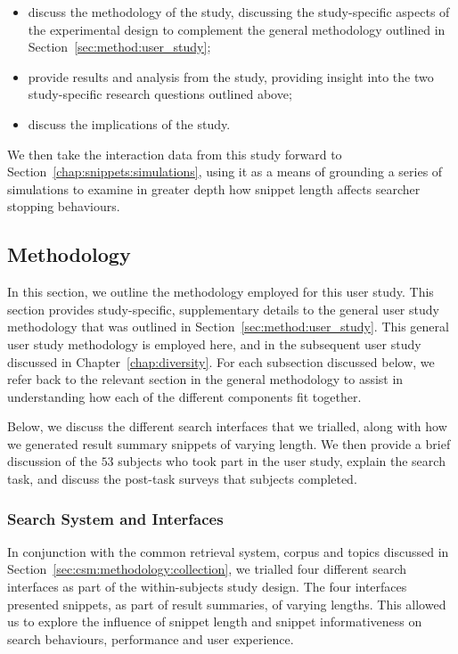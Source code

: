 \begin{itemize}
    \item{discuss the methodology of the study, discussing the study-specific aspects of the experimental design to complement the general methodology outlined in Section~\ref{sec:method:user_study};}
    \item{provide results and analysis from the study, providing insight into the two study-specific research questions outlined above;}
    \item{discuss the implications of the study.}
\end{itemize}

We then take the interaction data from this study forward to Section~\ref{chap:snippets:simulations}, using it as a means of grounding a series of simulations to examine in greater depth how snippet length affects searcher stopping behaviours.

\subsection{Methodology}
In this section, we outline the methodology employed for this user study. This section provides study-specific, supplementary details to the general user study methodology that was outlined in Section~\ref{sec:method:user_study}. This general user study methodology is employed here, and in the subsequent user study discussed in Chapter~\ref{chap:diversity}. For each subsection discussed below, we refer back to the relevant section in the general methodology to assist in understanding how each of the different components fit together.

Below, we discuss the different search interfaces that we trialled, along with how we generated result summary snippets of varying length. We then provide a brief discussion of the $53$ subjects who took part in the user study, explain the search task, and discuss the post-task surveys that subjects completed.

\subsubsection{Search System and Interfaces}
In conjunction with the common retrieval system, corpus and topics discussed in Section~\ref{sec:csm:methodology:collection}, we trialled four different search interfaces as part of the within-subjects study design. The four interfaces presented snippets, as part of result summaries, of varying lengths. This allowed us to explore the influence of snippet length and snippet informativeness on search behaviours, performance and user experience.

